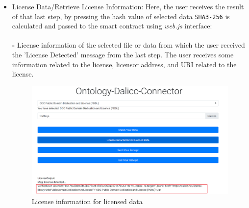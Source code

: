 \begin{itemize}
\begin{center}
\begin{figure}[htb!]
	\end{figure}
	
\end{center}
    \item License Data/Retrieve License Information:
	Here, the user receives the result of that last step, by pressing the hash value of selected data \texttt{SHA3-256} is calculated and passed to the smart contract using \textit{web.js} interface: \\
    \\
	\textbf{-} License information of the selected file or data from which the user received the 'License Detected' message from the last step. The user receives some information related to the license, licensor address, and URI related to the license.\\
    \begin{center}
	\begin{figure}[htb!]
		
		\begin{minipage}{0.55\linewidth}
			\centering
			\includegraphics[width=1.95\textwidth]{images/chap03_found_info.png}
		\end{minipage}
		\caption[License information for licensed data]{License information for licensed data}
		
	\end{figure}
	

\end{center}
\end{itemize}
